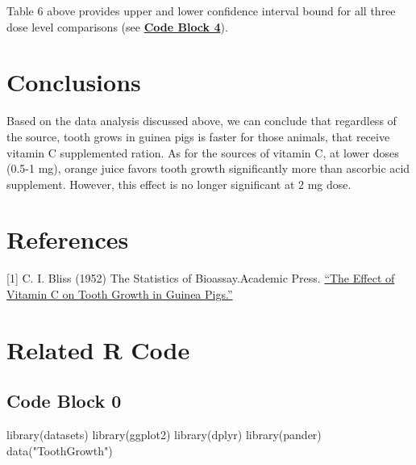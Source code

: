 \documentclass[]{article}
\newenvironment{Shaded}{}{}
\newcommand{\KeywordTok}[1]{\textcolor[rgb]{0.00,0.00,1.00}{{#1}}}
\newcommand{\StringTok}[1]{\textcolor[rgb]{0.00,0.50,0.50}{{#1}}}
\newcommand{\NormalTok}[1]{{#1}}
\begin{document}
Table 6 above provides upper and lower confidence interval bound for all
three dose level comparisons (see \textbf{\hyperref[code-block-4]{Code
Block 4}}).

\section{Conclusions}\label{conclusions}

Based on the data analysis discussed above, we can conclude that
regardless of the source, tooth grows in guinea pigs is faster for those
animals, that receive vitamin C supplemented ration. As for the sources
of vitamin C, at lower doses (0.5-1 mg), orange juice favors tooth
growth significantly more than ascorbic acid supplement. However, this
effect is no longer significant at 2 mg dose.

\section{References}\label{references}

{[}1{]} C. I. Bliss (1952) The Statistics of Bioassay.Academic Press.
\href{http://jn.nutrition.org/content/33/5/491.full.pdf}{``The Effect of
Vitamin C on Tooth Growth in Guinea Pigs.''}

\section{Related R Code}\label{related-r-code}

\subsection{Code Block 0}\label{code-block-0}

\begin{Shaded}
\begin{Highlighting}[]
\KeywordTok{library}\NormalTok{(datasets)}
\KeywordTok{library}\NormalTok{(ggplot2)}
\KeywordTok{library}\NormalTok{(dplyr)}
\KeywordTok{library}\NormalTok{(pander)}
\KeywordTok{data}\NormalTok{(}\StringTok{"ToothGrowth"}\NormalTok{)}
\end{Highlighting}
\end{Shaded}

\end{document}
